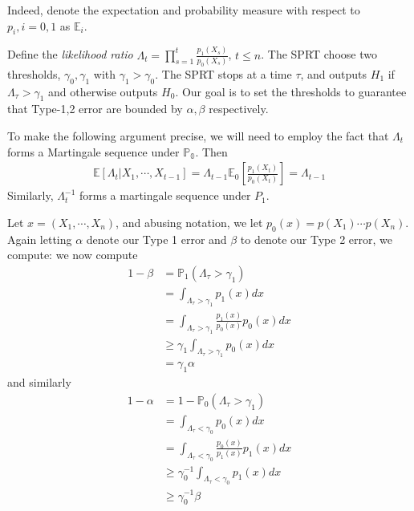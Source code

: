 \documentclass[11pt]{article}
\renewcommand{\P}{\mathbb{P}}
\newcommand{\E}{\mathbb{E}}
\newcommand{\1}{\mathbf{1}}
\begin{document}
Indeed, denote the expectation and probability measure with respect to $p_i, i=0,1$ as $\E_i$.

Define the \textit{likelihood ratio} $\Lambda_t = \prod_{s=1}^t \frac{p_1(X_s)}{p_0(X_s)}$, $t\leq n$. The SPRT choose two thresholds, $\gamma_0, \gamma_1$ with $\gamma_1 > \gamma_0$. The SPRT stops at a time $\tau$, and outputs $H_1$ if $\Lambda_{\tau} > \gamma_1$ and otherwise outputs $H_0$. Our goal is to set the thresholds to guarantee that Type-1,2 error are bounded by $\alpha, \beta$ respectively.  


To make the following argument precise, we will need to employ the fact that $\Lambda_t$ forms a Martingale sequence under $\mathbb{P_0}$.  Then 
\begin{align*}
    \E[\Lambda_t|X_1, \cdots, X_{t-1}] = \Lambda_{t-1} \E_0\left[\frac{p_1(X_{t})}{p_0(X_{t})}\right] = \Lambda_{t-1} 
\end{align*}
Similarly, $\Lambda_t^{-1}$ forms a martingale sequence under $P_1$.



\newcommand{\lambdatau}{\Lambda_{\tau}}
Let $x = (X_1, \cdots, X_n)$, and abusing notation, we let $p_0(x) = p(X_1)\cdots p(X_n)$. Again letting $\alpha$ denote our Type 1 error and $\beta$ to denote our Type 2 error, we compute:
we now compute 
\begin{align*}
    1-\beta 
    &= \P_1(\lambdatau > \gamma_1) \\
    &= \int_{\Lambda_{\tau} > \gamma_1} p_1(x) dx\\
    &= \int_{\Lambda_{\tau} > \gamma_1} \frac{p_1(x)}{p_0(x)} p_0(x)dx\tag{Wald's Ratio Identity}\\
    &\geq \gamma_1 \int_{\Lambda_{\tau} > \gamma_1} p_0(x) dx \\
    &= \gamma_1\alpha
\end{align*}
and similarly 
\begin{align*}
    1-\alpha
    &= 1-\P_0(\lambdatau > \gamma_1) \\
    &= \int_{\lambdatau < \gamma_0} p_0(x) dx\\
    &= \int_{\lambdatau < \gamma_0} \frac{p_0(x)}{p_1(x)} p_1(x)dx\tag{Wald's Ratio Identity}\\
    &\geq \gamma_0^{-1} \int_{\Lambda_{\tau} < \gamma_0} p_1(x) dx \\
    &\geq \gamma_0^{-1}\beta
\end{align*}
\end{document}

